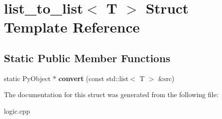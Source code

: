 \hypertarget{structlist__to__list}{}\section{list\+\_\+to\+\_\+list$<$ T $>$ Struct Template Reference}
\label{structlist__to__list}
\subsection*{Static Public Member Functions}
\begin{DoxyCompactItemize}
\item 
\mbox{\label{structlist__to__list_a78f6248834e55a178f71df835a2bd78f}} 
static Py\+Object $\ast$ {\bfseries convert} (const std\+::list$<$ T $>$ \&src)
\end{DoxyCompactItemize}


The documentation for this struct was generated from the following file\+:\begin{DoxyCompactItemize}
\item 
logic.\+cpp\end{DoxyCompactItemize}
